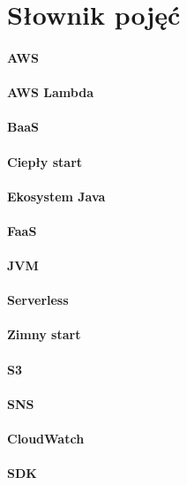 \chapter*{Słownik pojęć}

\subsubsection*{AWS}

\subsubsection*{AWS Lambda}

\subsubsection*{BaaS}

\subsubsection*{Ciepły start}

\subsubsection*{Ekosystem Java}

\subsubsection*{FaaS}

\subsubsection*{JVM}

\subsubsection*{Serverless}

\subsubsection*{Zimny start}

\subsubsection*{S3}

\subsubsection*{SNS}

\subsubsection*{CloudWatch}

\subsubsection*{SDK}
